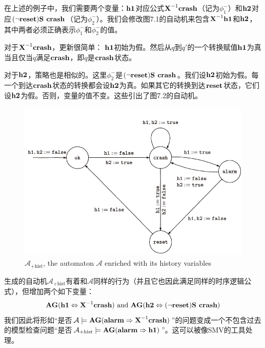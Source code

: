 \documentclass{book}
\begin{document}
    在上述的例子中，我们需要两个变量：$\text{\textbf{h1}}$对应公式$\text{\textbf{X}}^{-1}\text{\textbf{crash}}$（记为$\phi_1^-$）和$\text{\textbf{h2}}$对应$(\neg\text{\textbf{reset}})\text{\textbf{S crash}}$（记为$\phi_2^-$）。我们会修改图7.1的自动机来包含$\text{\textbf{X}} ^{-1}\text{\textbf{h1}}$和$\text{\textbf{h2}}$，其中两者必须正确表示$\phi_1^-$和$\phi_2^-$的值。

    对于$\text{\textbf{X}} ^{-1}\text{\textbf{crash}}$，更新很简单： $\text{\textbf{h1}}$初始为假。然后从$q$到$q'$的一个转换赋值$\text{\textbf{h1}}$为真当且仅当$q$满足$\text{\textbf{crash}}$，即$q$是$\text{\textbf{crash}}$状态。

    对于$\text{\textbf{h2}}$，策略也是相似的。这里$\phi_2^-$是$(\neg\text{\textbf{reset}})\text{\textbf{S crash}}$。我们设$\text{\textbf{h2}}$初始为假。每一个到达$\text{\textbf{crash}}$状态的转换都会设$\text{\textbf{h2}}$为真。如果其它的转换到达$\text{\textbf{reset}}$状态，它们设$\text{\textbf{h2}}$为假。否则，变量的值不变。这些引出了图7.2的自动机。
    \begin{figure}
        \centering
        \includegraphics[width=5.0in, height=3.0in]{7_2.jpg}
        \caption{$\mathcal{A}_{+\text{hist}}$, the automaton $\mathcal{A}$ enriched with its history variables}
    \end{figure}

    生成的自动机$\mathcal{A}_{+\text{hist}}$有着和$\mathcal{A}$同样的行为（并且它也因此满足同样的时序逻辑公式），但增加两个如下变量：
    \begin{equation*}
      \text{\textbf{AG}}(\text{\textbf{h1}}\Leftrightarrow\text{\textbf{X}}^{-1}\text{\textbf{crash}})\text{ and }\text{\textbf{AG}}(\text{\textbf{h2}}\Leftrightarrow(\neg\text{\textbf{reset}})\text{\textbf{S crash}})
    \end{equation*}
    我们因此将形如“是否$\mathcal{A}\models\text{\textbf{AG}}(\text{\textbf{alarm}}\Rightarrow\text{\textbf{X}} ^{-1}\text{\textbf{crash}})$”的问题变成一个不包含过去的模型检查问题“是否$\mathcal{A}_{+\text{hist}}\models\text{\textbf{AG}}(\text{\textbf{alarm}}\Rightarrow\text{\textbf{h1}})$”。这可以被像SMV的工具处理。
\end{document}
